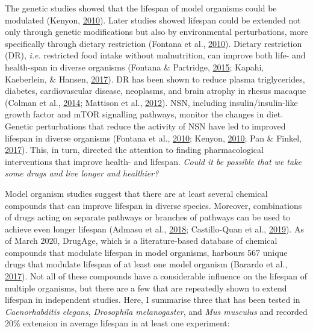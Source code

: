 \documentclass[12pt,twoside]{unicam}
\begin{document}
The genetic studies showed that the lifespan of model organisms could be modulated (Kenyon, \protect\hyperlink{ref-Kenyon2010}{2010}). Later studies showed lifespan could be extended not only through genetic modifications but also by environmental perturbations, more specifically through dietary restriction (Fontana et al., \protect\hyperlink{ref-Fontana2010}{2010}). Dietary restriction (DR), \emph{i.e.} restricted food intake without malnutrition, can improve both life- and health-span in diverse organisms (Fontana \& Partridge, \protect\hyperlink{ref-Fontana2015}{2015}; Kapahi, Kaeberlein, \& Hansen, \protect\hyperlink{ref-Kapahi2017}{2017}). DR has been shown to reduce plasma triglycerides, diabetes, cardiovascular disease, neoplasms, and brain atrophy in rhesus macaque (Colman et al., \protect\hyperlink{ref-Colman2014}{2014}; Mattison et al., \protect\hyperlink{ref-Mattison2012}{2012}). NSN, including insulin/insulin-like growth factor and mTOR signalling pathways, monitor the changes in diet. Genetic perturbations that reduce the activity of NSN have led to improved lifespan in diverse organisms (Fontana et al., \protect\hyperlink{ref-Fontana2010}{2010}; Kenyon, \protect\hyperlink{ref-Kenyon2010}{2010}; Pan \& Finkel, \protect\hyperlink{ref-Pan2017}{2017}). This, in turn, directed the attention to finding pharmacological interventions that improve health- and lifespan. \emph{Could it be possible that we take some drugs and live longer and healthier?}

Model organism studies suggest that there are at least several chemical compounds that can improve lifespan in diverse species. Moreover, combinations of drugs acting on separate pathways or branches of pathways can be used to achieve even longer lifespan (Admasu et al., \protect\hyperlink{ref-Admasu2018}{2018}; Castillo-Quan et al., \protect\hyperlink{ref-Castillo-Quan2019}{2019}). As of March 2020, DrugAge, which is a literature-based database of chemical compounds that modulate lifespan in model organisms, harbours 567 unique drugs that modulate lifespan of at least one model organism (Barardo et al., \protect\hyperlink{ref-Barardo2017}{2017}). Not all of these compounds have a considerable influence on the lifespan of multiple organisms, but there are a few that are repeatedly shown to extend lifespan in independent studies. Here, I summarise three that has been tested in \emph{Caenorhabditis elegans}, \emph{Drosophila melanogaster}, and \emph{Mus musculus} and recorded 20\% extension in average lifespan in at least one experiment:
\end{document}
